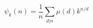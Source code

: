 \documentclass{article}
\begin{document}
    $$ \psi_k(n) = \frac{1}{n} \sum_{d|n} \mu(d)k^{n/d} $$
\end{document}
